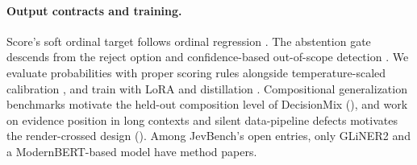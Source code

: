 \paragraph{Output contracts and training.} Score's soft ordinal target follows ordinal regression
\citep{frank2001ordinal,cao2020coral}. The abstention gate descends from the reject option
\citep{chow1970reject,geifman2017selective} and confidence-based out-of-scope detection
\citep{hendrycks2017msp,larson2019clinc}. We evaluate probabilities with proper scoring rules
\citep{gneiting2007scoringrules} alongside temperature-scaled calibration \citep{guo2017calibration},
and train with LoRA \citep{hu2022lora} and distillation \citep{hinton2015distillation}. Compositional
generalization benchmarks \citep{lake2018scan,keysers2020cfq} motivate the held-out composition level of
DecisionMix (), and work on evidence position in long contexts
\citep{liu2024lostmiddle} and silent data-pipeline defects \citep{sambasivan2021datacascades} motivates
the render-crossed design (). Among JevBench's open entries, only GLiNER2
\citep{zaratiana2025gliner2} and a ModernBERT-based model \citep{warner2024modernbert} have method
papers.

